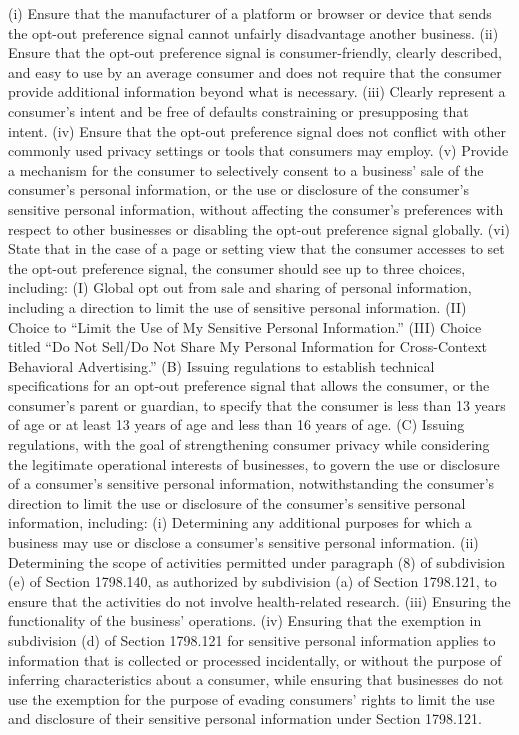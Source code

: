(i) Ensure that the manufacturer of a platform or browser or device that sends the opt-out preference signal cannot unfairly disadvantage another business.
(ii) Ensure that the opt-out preference signal is consumer-friendly, clearly described, and easy to use by an average consumer and does not require that the consumer provide additional information beyond what is necessary.
(iii) Clearly represent a consumer’s intent and be free of defaults constraining or presupposing that intent.
(iv) Ensure that the opt-out preference signal does not conflict with other commonly used privacy settings or tools that consumers may employ.
(v) Provide a mechanism for the consumer to selectively consent to a business’ sale of the consumer’s personal information, or the use or disclosure of the consumer’s sensitive personal information, without affecting the consumer’s preferences with respect to other businesses or disabling the opt-out preference signal globally.
(vi) State that in the case of a page or setting view that the consumer accesses to set the opt-out preference signal, the consumer should see up to three choices, including:
(I) Global opt out from sale and sharing of personal information, including a direction to limit the use of sensitive personal information.
(II) Choice to “Limit the Use of My Sensitive Personal Information.”
(III) Choice titled “Do Not Sell/Do Not Share My Personal Information for Cross-Context Behavioral Advertising.”
(B) Issuing regulations to establish technical specifications for an opt-out preference signal that allows the consumer, or the consumer’s parent or guardian, to specify that the consumer is less than 13 years of age or at least 13 years of age and less than 16 years of age.
(C) Issuing regulations, with the goal of strengthening consumer privacy while considering the legitimate operational interests of businesses, to govern the use or disclosure of a consumer’s sensitive personal information, notwithstanding the consumer’s direction to limit the use or disclosure of the consumer’s sensitive personal information, including:
(i) Determining any additional purposes for which a business may use or disclose a consumer’s sensitive personal information.
(ii) Determining the scope of activities permitted under paragraph (8) of subdivision (e) of Section 1798.140, as authorized by subdivision (a) of Section 1798.121, to ensure that the activities do not involve health-related research.
(iii) Ensuring the functionality of the business’ operations.
(iv) Ensuring that the exemption in subdivision (d) of Section 1798.121 for sensitive personal information applies to information that is collected or processed incidentally, or without the purpose of inferring characteristics about a consumer, while ensuring that businesses do not use the exemption for the purpose of evading consumers’ rights to limit the use and disclosure of their sensitive personal information under Section 1798.121.
